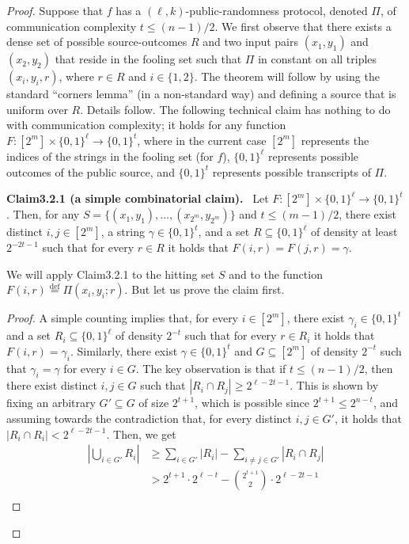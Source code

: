 \documentclass[10pt,a4paper]{article}
\newenvironment{authorclaim}[1]{\par\medskip\noindent\textbf{#1.}\ }{\par\medskip}
\begin{document}
\begin{proof}
Suppose that $f$ has a $(\ell,k)$-public-randomness protocol, denoted $\Pi$, of communication complexity $t\le(n-1)/2$. We first observe that there exists a dense set of possible source-outcomes $R$ and two input pairs $(x_1,y_1)$ and $(x_2,y_2)$ that reside in the fooling set such that $\Pi$ in constant on all triples $(x_i,y_i,r)$, where $r\in R$ and $i\in\{1,2\}$. The theorem will follow by using the standard ``corners lemma'' (in a non-standard way) and defining a source that is uniform over $R$. Details follow.
The following technical claim has nothing to do with communication complexity; it holds for any function $F:[2^m]\times\{0,1\}^\ell\to\{0,1\}^t$, where in the current case $[2^m]$ represents the indices of the strings in the fooling set (for $f$), $\{0,1\}^\ell$ represents possible outcomes of the public source, and $\{0,1\}^t$ represents possible transcripts of $\Pi$.
\begin{authorclaim}{Claim3.2.1 (a simple combinatorial claim)}
Let $F:[2^m]\times\{0,1\}^\ell\to\{0,1\}^t$. Then, for any $S=\{(x_1,y_1),\ldots,(x_{2^m},y_{2^m})\}$ and $t\le(m-1)/2$, there exist distinct $i,j\in[2^m]$, a string $\gamma\in\{0,1\}^t$, and a set $R\subseteq\{0,1\}^\ell$ of density at least $2^{-2t-1}$ such that for every $r\in R$ it holds that $F(i,r)=F(j,r)=\gamma$.
\end{authorclaim}
We will apply Claim3.2.1 to the hitting set $S$ and to the function $F(i,r)\stackrel{\mathrm{def}}=\Pi(x_i,y_i;r)$. But let us prove the claim first.
\begin{proof}
A simple counting implies that, for every $i\in[2^m]$, there exist $\gamma_i\in\{0,1\}^t$ and a set $R_i\subseteq\{0,1\}^\ell$ of density $2^{-t}$ such that for every $r\in R_i$ it holds that $F(i,r)=\gamma_i$. Similarly, there exist $\gamma\in\{0,1\}^t$ and $G\subseteq[2^m]$ of density $2^{-t}$ such that $\gamma_i=\gamma$ for every $i\in G$.
The key observation is that if $t\le(n-1)/2$, then there exist distinct $i,j\in G$ such that $|R_i\cap R_j|\ge2^{\ell-2t-1}$. This is shown by fixing an arbitrary $G'\subseteq G$ of size $2^{t+1}$, which is possible since $2^{t+1}\le2^{n-t}$, and assuming towards the contradiction that, for every distinct $i,j\in G'$, it holds that $|R_i\cap R_i|<2^{\ell-2t-1}$. Then, we get
\begin{align*}
\left|\bigcup_{i\in G'}R_i\right|&\ge\sum_{i\in G'}|R_i|-\sum_{i\ne j\in G'}|R_i\cap R_j|\\
&>2^{t+1}\cdot2^{\ell-t}-\binom{2^{t+1}}2\cdot2^{\ell-2t-1}\\

\end{align*}
\end{proof}
\end{proof}
\end{document}
